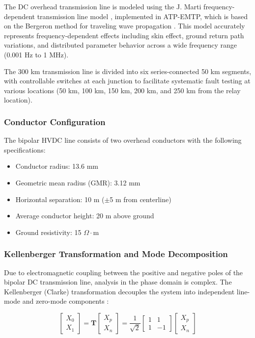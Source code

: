 \documentclass[journal]{IEEEtran}
\begin{document}
The DC overhead transmission line is modeled using the J. Marti frequency-dependent transmission line model \cite{marti1982accurate}, implemented in ATP-EMTP, which is based on the Bergeron method for traveling wave propagation \cite{dommel1969, greenwood1991}. This model accurately represents frequency-dependent effects including skin effect, ground return path variations, and distributed parameter behavior across a wide frequency range (0.001 Hz to 1 MHz).

The 300 km transmission line is divided into six series-connected 50 km segments, with controllable switches at each junction to facilitate systematic fault testing at various locations (50 km, 100 km, 150 km, 200 km, and 250 km from the relay location).

\subsubsection{Conductor Configuration}

The bipolar HVDC line consists of two overhead conductors with the following specifications:
\begin{itemize}
    \item Conductor radius: 13.6 mm
    \item Geometric mean radius (GMR): 3.12 mm  
    \item Horizontal separation: 10 m ($\pm$5 m from centerline)
    \item Average conductor height: 20 m above ground
    \item Ground resistivity: 15 $\Omega\cdot$m
\end{itemize}

\subsubsection{Kellenberger Transformation and Mode Decomposition}

Due to electromagnetic coupling between the positive and negative poles of the bipolar DC transmission line, analysis in the phase domain is complex. The Kellenberger (Clarke) transformation decouples the system into independent line-mode and zero-mode components \cite{reference_paper_frechet, dommel1969}:

\begin{equation}
\begin{bmatrix}
X_0 \\ X_1
\end{bmatrix}
= \mathbf{T}
\begin{bmatrix}
X_p \\ X_n
\end{bmatrix}
= \frac{1}{\sqrt{2}}
\begin{bmatrix}
1 & 1 \\
1 & -1
\end{bmatrix}
\begin{bmatrix}
X_p \\ X_n
\end{bmatrix}
\label{eq:clarke_transform}
\end{equation}
\end{document}
